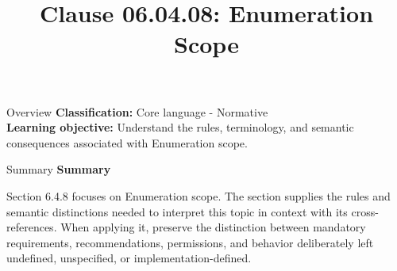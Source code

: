 \documentclass[10pt,letterpaper]{article}
\title{Clause 06.04.08: Enumeration Scope}
\author{}
\date{}
\begin{document}
\maketitle
\begin{CornellOverviewBox}{Overview}
\textbf{Classification:} Core language - Normative\\[2pt]
\textbf{Learning objective:} Understand the rules, terminology, and semantic consequences associated with Enumeration scope.
\end{CornellOverviewBox}\begin{CornellSummaryBox}{Summary}
{\sffamily\bfseries\color{Accent} Summary}\par\vspace{3pt}Section 6.4.8 focuses on Enumeration scope. The section supplies the rules and semantic distinctions needed to interpret this topic in context with its cross-references. When applying it, preserve the distinction between mandatory requirements, recommendations, permissions, and behavior deliberately left undefined, unspecified, or implementation-defined.
\end{CornellSummaryBox}
\end{document}
